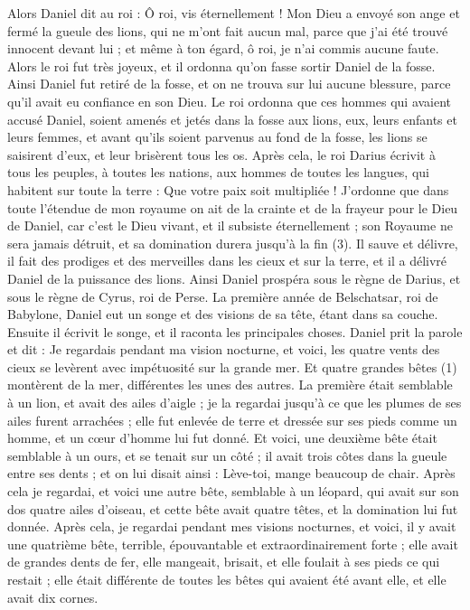 \begin{multicols}{2}
Alors Daniel dit au roi : Ô roi, vis éternellement !
Mon Dieu a envoyé son ange et fermé la gueule des lions, qui ne m'ont fait aucun mal, parce que j'ai été trouvé innocent devant lui ; et même à ton égard, ô roi,  je n'ai commis aucune faute.
Alors le roi fut très joyeux, et il ordonna qu'on fasse sortir Daniel de la fosse. Ainsi Daniel fut retiré de la fosse, et on ne trouva sur lui aucune blessure, parce qu'il avait eu confiance en son Dieu.
Le roi ordonna que ces hommes qui avaient accusé Daniel, soient amenés et jetés dans la fosse aux lions, eux, leurs enfants et leurs femmes, et avant qu'ils soient parvenus au fond de la fosse, les lions se saisirent d'eux, et leur brisèrent tous les os.
Après cela, le roi Darius écrivit à tous les peuples, à toutes les nations, aux hommes de toutes les langues, qui habitent sur toute la terre : Que votre paix soit multipliée !
J’ordonne que dans toute l'étendue de mon royaume on ait de la crainte et de la frayeur pour le Dieu de Daniel, car c'est le Dieu vivant, et il subsiste éternellement ; son Royaume ne sera jamais détruit, et sa domination durera jusqu'à la fin (3).
Il sauve et délivre, il fait des prodiges et des merveilles dans les cieux et sur la terre, et il a délivré Daniel de la puissance des lions.
Ainsi Daniel prospéra sous le règne de Darius, et sous le règne de Cyrus, roi de Perse.
\VerseOne{}La première année de Belschatsar, roi de Babylone, Daniel eut un songe et des visions de sa tête,  étant dans sa couche. Ensuite il écrivit le songe, et il raconta les principales choses.
Daniel prit la parole et dit : Je regardais pendant ma vision nocturne, et voici, les quatre vents des cieux se levèrent avec impétuosité sur la grande mer.
Et quatre grandes bêtes (1) montèrent de la mer, différentes les unes des autres.
La première était semblable à un lion, et avait des ailes d'aigle ; je la regardai jusqu'à ce que les plumes de ses ailes furent arrachées ; elle fut enlevée de terre et dressée sur ses pieds comme un homme, et un cœur d'homme lui fut donné.
Et voici, une deuxième bête  était semblable à un ours, et se tenait sur un côté ;  il avait trois côtes dans la gueule entre ses dents ; et on lui disait ainsi : Lève-toi, mange beaucoup de chair.
Après cela je regardai, et voici une autre bête, semblable à un léopard, qui avait sur son dos quatre ailes d'oiseau, et cette bête avait quatre têtes, et la domination lui fut donnée.
Après cela, je regardai pendant mes visions nocturnes, et voici, il y avait une quatrième bête, terrible, épouvantable et extraordinairement forte ; elle avait de grandes dents de fer, elle mangeait, brisait, et elle foulait à ses pieds ce qui restait ;  elle était différente de toutes les bêtes qui avaient été avant elle, et elle avait dix cornes.

\end{multicols}
